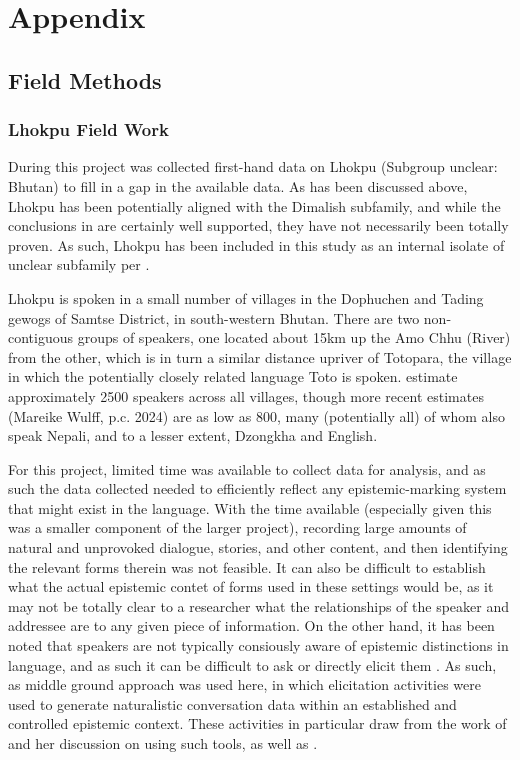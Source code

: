 \chapter{Appendix}
\section{Field Methods}\label{s:Methods:FieldMethods}
\subsection{Lhokpu Field Work}
During this project was collected first-hand data on Lhokpu (Subgroup unclear: Bhutan) to fill in a gap in the available data. As has been discussed above, Lhokpu has been potentially aligned with the Dimalish subfamily, and while the conclusions in  are certainly well supported, they have not necessarily been totally proven. As such, Lhokpu has been included in this study as an internal isolate of unclear subfamily per .

Lhokpu is spoken in a small number of villages in the Dophuchen and Tading gewogs of Samtse District, in  south-western Bhutan. There are two non-contiguous groups of speakers, one located about 15km up the Amo Chhu (River) from the other, which is in turn a similar distance upriver of Totopara, the village in which the potentially closely related language Toto is spoken.  estimate approximately 2500 speakers across all villages, though more recent estimates (Mareike Wulff, p.c. 2024) are as low as 800, many (potentially all) of whom also speak Nepali, and to a lesser extent, Dzongkha and English.

For this project, limited time was available to collect data for analysis, and as such the data collected needed to efficiently reflect any epistemic-marking system that might exist in the language. With the time available (especially given this was a smaller component of the larger project), recording large amounts of natural and unprovoked dialogue, stories, and other content, and then identifying the relevant forms therein was not feasible. It can also be difficult to establish what the actual epistemic contet of forms used in these settings would be, as it may not be totally clear to a researcher what the relationships of the speaker and addressee are to any given piece of information. On the other hand, it has been noted that speakers are not typically consiously aware of epistemic distinctions in language, and as such it can be difficult to ask or directly elicit them \cite{Grzech2020}. As such, as middle ground approach was used here, in which elicitation activities were used to generate naturalistic conversation data within an established and controlled epistemic context. These activities in particular draw from the work of  and her discussion on using such tools, as well as . 

